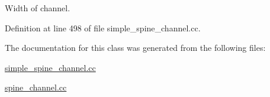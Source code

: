Width of channel. 



Definition at line 498 of file simple\+\_\+spine\+\_\+channel.\+cc.



The documentation for this class was generated from the following files\+:\begin{DoxyCompactItemize}
\item 
\hyperlink{simple__spine__channel_8cc}{simple\+\_\+spine\+\_\+channel.\+cc}\item 
\hyperlink{spine__channel_8cc}{spine\+\_\+channel.\+cc}\end{DoxyCompactItemize}
